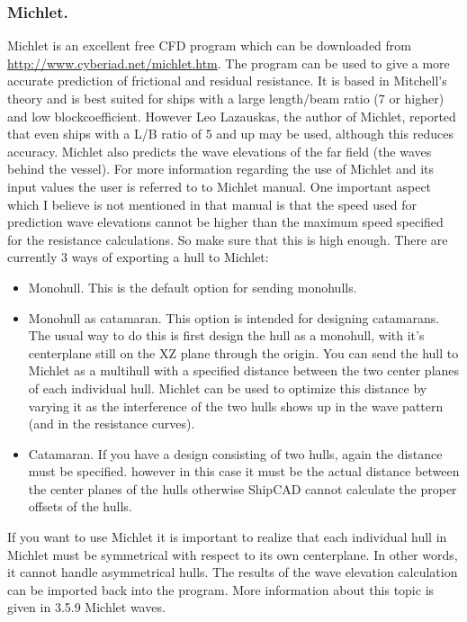 \documentclass[12pt]{article}
\begin{document}
\subsubsection{Michlet.}
Michlet is an excellent free CFD program which can be downloaded from
\url{http://www.cyberiad.net/michlet.htm}. The program can be used to give a more accurate prediction
of frictional and residual resistance. It is based in
Mitchell's theory and is best suited for ships with a
large length/beam ratio (7 or higher) and low
blockcoefficient. However Leo Lazauskas, the author
of Michlet, reported that even ships with a L/B ratio of
5 and up may be used, although this reduces
accuracy. Michlet also predicts the wave elevations
of the far field (the waves behind the vessel). For
more information regarding the use of Michlet and its
input values the user is referred to to Michlet manual.
One important aspect which I believe is not
mentioned in that manual is that the speed used for
prediction wave elevations cannot be higher than the
maximum speed specified for the resistance
calculations. So make sure that this is high enough.
There are currently 3 ways of exporting a hull to Michlet:

\begin{itemize}
  \item Monohull. This is the default option for sending monohulls.
  \item Monohull as catamaran. This option is intended for designing catamarans. The usual
way to do this is first design the hull as a monohull, with it's centerplane still on the XZ
plane through the origin. You can send the hull to Michlet as a multihull with a specified
distance between the two center planes of each individual hull. Michlet can be used to
optimize this distance by varying it as the interference of the two hulls shows up in the
wave pattern (and in the resistance curves).
  \item Catamaran. If you have a design consisting of two hulls, again the distance must be
specified. however in this case it must be the actual distance between the center planes
of the hulls otherwise ShipCAD cannot calculate the proper offsets of
the hulls.
\end{itemize}

If you want to use Michlet it is important to realize that each individual hull in Michlet must be
symmetrical with respect to its own centerplane. In other words, it cannot handle asymmetrical hulls.
The results of the wave elevation calculation can be imported back into the program. More
information about this topic is given in 3.5.9 Michlet waves.
\end{document}
